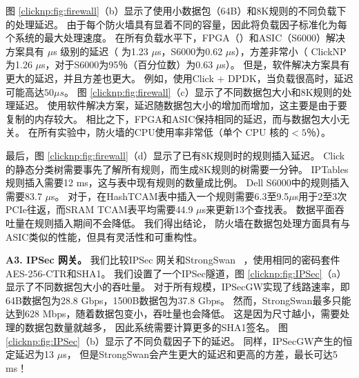 图 \ref {clicknp:fig:firewall}（b）显示了使用小数据包（64B）和8K规则的不同负载下的处理延迟。
由于每个防火墙具有显着不同的容量，因此将负载因子标准化为每个系统的最大处理速度。
在所有负载水平下，FPGA（\name{}）和ASIC（S6000）解决方案具有 $\mu$s 级别的延迟（\name{} 为1.23 $\mu$s，S6000为0.62 $\mu$s），方差非常小（ ClickNP为1.26 $\mu$s，对于S6000为95％（百分位数）为0.63 $\mu$s）。
但是，软件解决方案具有更大的延迟，并且方差也更大。
例如，使用Click + DPDK，当负载很高时，延迟可能高达$ 50 \mu{}s $。
图 \ref {clicknp:fig:firewall}（c）显示了不同数据包大小和8K规则的处理延迟。
使用软件解决方案，延迟随数据包大小的增加而增加，这主要是由于要复制的内存较大。
相比之下，FPGA和ASIC保持相同的延迟，而与数据包大小无关。
在所有实验中，\name 防火墙的CPU使用率非常低（单个 CPU 核的$ <5 ％$）。

最后，图 \ref {clicknp:fig:firewall}（d）显示了已有8K规则时的规则插入延迟。 Click的静态分类树需要事先了解所有规则，而生成8K规则的树需要一分钟。
IPTables规则插入需要12 ms，这与表中现有规则的数量成比例。
Dell S6000中的规则插入需要83.7 $\mu$s。
对于\name{}，在HashTCAM表中插入一个规则需要6.3至9.5$\mu$s用于2至3次PCIe往返，而SRAM TCAM表平均需要44.9 $\mu$s来更新13个查找表。
\name 数据平面吞吐量在规则插入期间不会降低。
我们得出结论，\name{} 防火墙在数据包处理方面具有与ASIC类似的性能，但具有灵活性和可重构性。


\textbf {A3. IPSec 网关。}
我们比较IPSec 网关和StrongSwan~ \cite {strongswan}，使用相同的密码套件AES-256-CTR和SHA1。
我们设置了一个IPSec隧道，图 \ref {clicknp:fig:IPSec}（a）显示了不同数据包大小的吞吐量。
对于所有规模，IPSecGW实现了线路速率，即64B数据包为28.8 Gbps，1500B数据包为37.8 Gbps。
然而，StrongSwan最多只能达到628 Mbps，随着数据包变小，吞吐量也会降低。
这是因为尺寸越小，需要处理的数据包数量就越多，
因此系统需要计算更多的SHA1签名。
图 \ref {clicknp:fig:IPSec}（b）显示了不同负载因子下的延迟。 同样，IPSecGW产生的恒定延迟为13 $\mu$s，
但是StrongSwan会产生更大的延迟和更高的方差，最长可达5 ms！

